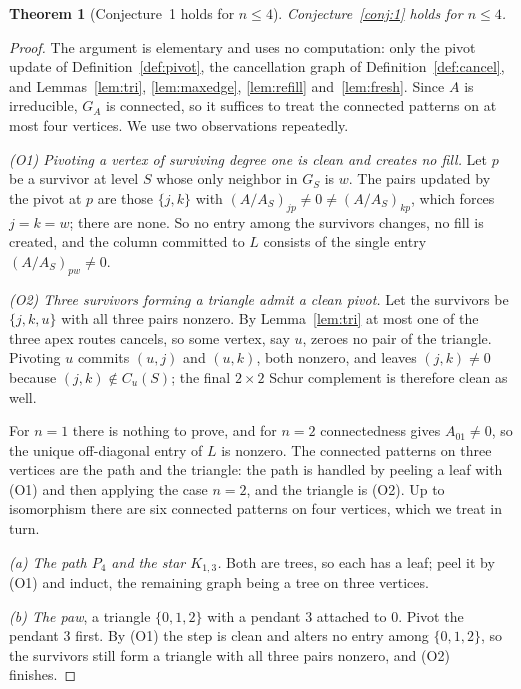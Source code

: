 \documentclass[11pt]{article}
\theoremstyle{plain}
\newtheorem{theorem}{Theorem}[section]
\theoremstyle{definition}
\begin{document}
\begin{humanblock}
\begin{theorem}[Conjecture~1 holds for $n\le4$]\label{thm:leq4}
Conjecture~\ref{conj:1} holds for $n\le4$.
\end{theorem}
\begin{proof}
The argument is elementary and uses no computation: only the pivot update of
Definition~\ref{def:pivot}, the cancellation graph of Definition~\ref{def:cancel}, and
Lemmas~\ref{lem:tri}, \ref{lem:maxedge}, \ref{lem:refill} and~\ref{lem:fresh}. Since $A$ is
irreducible, $G_A$ is connected, so it suffices to treat the connected patterns on at most four
vertices. We use two observations repeatedly.

\emph{(O1) Pivoting a vertex of surviving degree one is clean and creates no fill.} Let $p$ be a
survivor at level $S$ whose only neighbor in $G_S$ is $w$. The pairs updated by the pivot at $p$ are
those $\{j,k\}$ with $(A/A_S)_{jp}\neq0\neq(A/A_S)_{kp}$, which forces $j=k=w$; there are none. So no
entry among the survivors changes, no fill is created, and the column committed to $L$ consists of the
single entry $(A/A_S)_{pw}\neq0$.

\emph{(O2) Three survivors forming a triangle admit a clean pivot.} Let the survivors be $\{j,k,u\}$
with all three pairs nonzero. By Lemma~\ref{lem:tri} at most one of the three apex routes cancels, so
some vertex, say $u$, zeroes no pair of the triangle. Pivoting $u$ commits $(u,j)$ and $(u,k)$, both
nonzero, and leaves $(j,k)\neq0$ because $(j,k)\notin C_u(S)$; the final $2\times2$ Schur complement
is therefore clean as well.

For $n=1$ there is nothing to prove, and for $n=2$ connectedness gives $A_{01}\neq0$, so the unique
off-diagonal entry of $L$ is nonzero. The connected patterns on three vertices are the path and the
triangle: the path is handled by peeling a leaf with (O1) and then applying the case $n=2$, and the
triangle is (O2). Up to isomorphism there are six connected patterns on four vertices, which we treat
in turn.

\emph{(a) The path $P_4$ and the star $K_{1,3}$.} Both are trees, so each has a leaf; peel it by (O1)
and induct, the remaining graph being a tree on three vertices.

\emph{(b) The paw}, a triangle $\{0,1,2\}$ with a pendant $3$ attached to $0$. Pivot the pendant $3$
first. By (O1) the step is clean and alters no entry among $\{0,1,2\}$, so the survivors still form a
triangle with all three pairs nonzero, and (O2) finishes.


\end{proof}
\end{humanblock}
\end{document}
